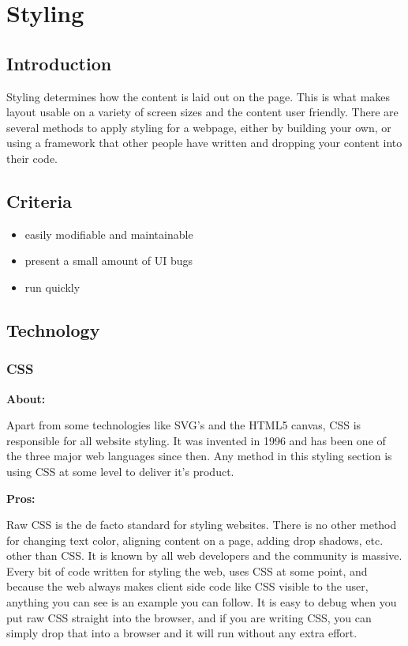 \documentclass[draftclsnofoot,onecolumn,letterpaper,10pt,compsoc]{IEEEtran}
\begin{document}
\section{Styling}

  \subsection{Introduction}
  Styling determines how the content is laid out on the page.
  This is what makes layout usable on a variety of screen sizes and the content user friendly.
  There are several methods to apply styling for a webpage, either by building your own, or using a framework that other people have written and dropping your content into their code.

  \subsection{Criteria}
  \begin{itemize}
    \item easily modifiable and maintainable
    \item present a small amount of UI bugs
    \item run quickly
  \end{itemize}

  \subsection{Technology}
    \subsubsection{CSS}

    \textbf{About:}

    Apart from some technologies like SVG's and the HTML5 canvas, CSS is responsible for all website styling.
    It was invented in 1996 and has been one of the three major web languages since then.
    Any method in this styling section is using CSS at some level to deliver it's product.\cite{CSSHistory}

    \noindent \textbf{Pros:}

    Raw CSS is the de facto standard for styling websites.
    There is no other method for changing text color, aligning content on a page, adding drop shadows, etc. other than CSS.
    It is known by all web developers and the community is massive.
    Every bit of code written for styling the web, uses CSS at some point, and because the web always makes client side code like CSS visible to the user, anything you can see is an example you can follow.
    It is easy to debug when you put raw CSS straight into the browser, and if you are writing CSS, you can simply drop that into a browser and it will run without any extra effort.\cite{CSSProCon}
\end{document}
